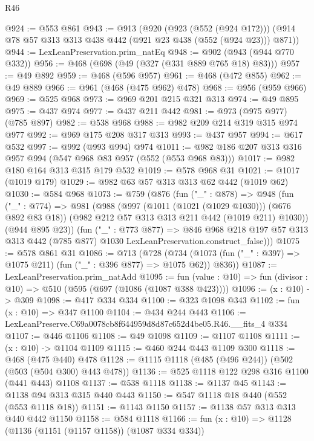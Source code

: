 \begin{lexlean}{R46}
\begin{coremodule}
@924 := @553 @861
@943 := @913
    (@920
      (@923 (@552 (@924 @172)))
      (@914 @78 @57 @313 @313 @438 @442 (@921 @23 @438 (@552 (@924 @23))) @871))
@944 := LexLeanPreservation.prim_natEq
@948 := @902 (@943 (@944 @770 @332))
@956 := @468 (@698 (@49 (@327 (@331 @889 @765 @18) @83)))
@957 := @49 @892
@959 := @468 (@596 @957)
@961 := @468 (@472 @855)
@962 := @49 @889
@966 := @961 (@468 (@475 @962) @478)
@968 := @956 (@959 @966)
@969 := @525 @968
@973 := @969 @201 @215 @321 @313
@974 := @49 @895
@975 := @437 @974
@977 := @437 @211 @442
@981 := @973 (@975 @977) (@785 @897)
@982 := @538 @968
@988 := @982 @209 @214 @319 @315 @974 @977
@992 := @969 @175 @208 @317 @313
@993 := @437 @957
@994 := @617 @532
@997 := @992 (@993 @994) @974
@1011 := @982 @186 @207 @313 @316 @957 @994 (@547 @968 @83 @957 (@552 (@553 @968 @83)))
@1017 := @982 @180 @164 @313 @315 @179 @532
@1019 := @578 @968 @31
@1021 := @1017 (@1019 @179)
@1029 := @982 @63 @57 @313 @313 @62 @442 (@1019 @62)
@1030 := @584 @968
@1073 := @759
    (@876
      (fun ("_" : @878) =>
      @948
        (fun ("_" : @774) =>
        @981
          (@988
            (@997 (@1011 (@1021 (@1029 @1030))) (@676 @892 @83 @18))
            (@982 @212 @57 @313 @313 @211 @442 (@1019 @211) @1030))
          (@944 @895 @23))
        (fun ("_" : @773 @877) =>
        @846
          @968
          @218
          @197
          @57
          @313
          @313
          @442
          (@785 @877)
          @1030
          LexLeanPreservation.construct_false)))
@1075 := @578 @861 @31
@1086 := @713
    (@728 (@734 (@1073 (fun ("_" : @397) => @1075 @211) (fun ("_" : @396 @877) => @1075 @62)) @836))
@1087 := LexLeanPreservation.prim_natAdd
@1095 := fun (value : @10) => fun (divisor : @10) => @510 (@595 (@697 (@1086 (@1087 @388 @423))))
@1096 := (x : @10) -> @309
@1098 := @417 @334 @334
@1100 := @323 @1098 @343
@1102 := fun (x : @10) => @347 @1100
@1104 := @434 @244 @443
@1106 := LexLeanPreserve.C69a0078cb8f644959d8d87c652d4be05.R46.__fits_4 @334
@1107 := @446 @1106
@1108 := @49 @1098
@1109 := @1107 @1108
@1111 := (x : @10) -> @1104 @1109
@1115 := @460 @244 @443 @1109 @300
@1118 := @468 (@475 @440) @478
@1128 := @1115 @1118 (@485 (@496 @244)) (@502 (@503 (@504 @300) @443 @478))
@1136 := @525 @1118 @122 @298 @316 @1100 (@441 @443) @1108
@1137 := @538 @1118
@1138 := @1137 @45
@1143 := @1138 @94 @313 @315 @440 @443
@1150 := @547 @1118 @18 @440 (@552 (@553 @1118 @18))
@1151 := @1143 @1150
@1157 := @1138 @57 @313 @313 @440 @442 @1150
@1158 := @584 @1118
@1166 := fun (x : @10) => @1128 (@1136 (@1151 (@1157 @1158)) (@1087 @334 @334))

\end{coremodule}
\end{lexlean}
